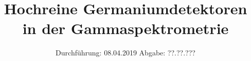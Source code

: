 

\subject{Versuch 18}
\title{Hochreine Germaniumdetektoren in der Gammaspektrometrie}
\date{%
  Durchführung: 08.04.2019
  \hspace{3em}
  Abgabe: ??.??.???
}



\maketitle
\thispagestyle{empty}
\tableofcontents
\newpage






\printbibliography{}


